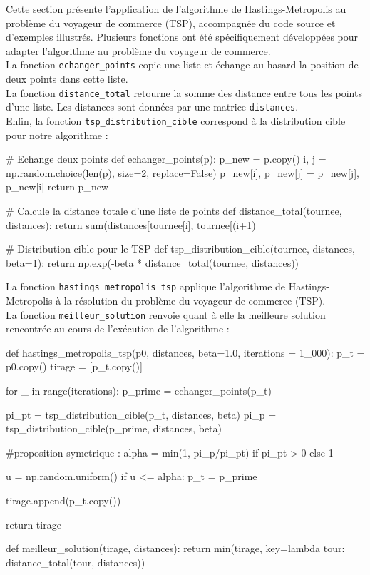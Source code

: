 \documentclass{article}
\begin{document}
Cette section présente l'application de l'algorithme de Hastings-Metropolis au problème du voyageur de commerce (TSP), accompagnée du code source et d'exemples illustrés.
Plusieurs fonctions ont été spécifiquement développées pour adapter l'algorithme au problème du voyageur de commerce. \\

La fonction \texttt{echanger\_points} copie une liste et échange au hasard la position de deux points dans cette liste. \\
La fonction \texttt{distance\_total} retourne la somme des distance entre tous les points d'une liste. Les distances sont données par une matrice \texttt{distances}. \\
Enfin, la fonction \texttt{tsp\_distribution\_cible} correspond à la distribution cible pour notre algorithme :

\begin{python}
# Echange deux points
def echanger_points(p):
    p_new = p.copy()
    i, j = np.random.choice(len(p), size=2, replace=False)
    p_new[i], p_new[j] = p_new[j], p_new[i]
    return p_new

# Calcule la distance totale d'une liste de points 
def distance_total(tournee, distances):
    return sum(distances[tournee[i], tournee[(i+1) %

# Distribution cible pour le TSP
def tsp_distribution_cible(tournee, distances, beta=1):
    return np.exp(-beta * distance_total(tournee, distances))
\end{python}
\vspace{0.3cm}

La fonction \texttt{hastings\_metropolis\_tsp} applique l'algorithme de Hastings-Metropolis à la résolution du problème du voyageur de commerce (TSP). \\
La fonction \texttt{meilleur\_solution} renvoie quant à elle la meilleure solution rencontrée au cours de l'exécution de l'algorithme :

\begin{python}
def hastings_metropolis_tsp(p0, distances, beta=1.0, iterations = 1_000):
    p_t = p0.copy()
    tirage = [p_t.copy()]

    for _ in range(iterations):
        p_prime = echanger_points(p_t)

        pi_pt = tsp_distribution_cible(p_t, distances, beta)
        pi_p = tsp_distribution_cible(p_prime, distances, beta)

        #proposition symetrique :
        alpha = min(1, pi_p/pi_pt) if pi_pt > 0 else 1

        u = np.random.uniform()
        if u <= alpha:
            p_t = p_prime
        
        tirage.append(p_t.copy())
    
    return tirage

def meilleur_solution(tirage, distances):
    return min(tirage, key=lambda tour: distance_total(tour, distances))
\end{python}
\end{document}
